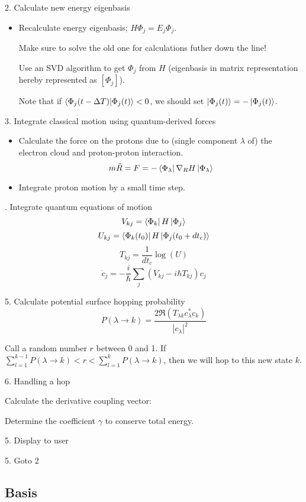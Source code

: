 \documentclass[12pt]{article}
\newcommand{\eigbasis}[0]{[\Phi_j]}
\begin{document}
2. Calculate new energy eigenbasis
\begin{itemize}
    \item Recalculate energy eigenbasis; $H\Phi_j = E_j\Phi_j$.

        Make sure to solve the old one for calculations futher down the line!

        Use an SVD algorithm to get $\Phi_j$ from $H$ (eigenbasis in matrix representation hereby represented as $\eigbasis$).

        Note that if $\bra{\Phi_j(t - \Delta T)}\ket{\Phi_j(t)} < 0$, we should set $\ket{\Phi_j(t)} = -\ket{\Phi_j(t)}$.
\end{itemize}

3. Integrate classical motion using quantum-derived forces
\begin{itemize}
    \item Calculate the force on the protons due to (single component $\lambda$ of) the electron cloud and proton-proton interaction.
        \[ m\ddot{R} = F = -\bra{\Phi_\lambda}\nabla_R H\ket{\Phi_\lambda} \]

    \item Integrate proton motion by a small time step.
\end{itemize}

. Integrate quantum equations of motion
\[ V_{kj} = \bra{\Phi_k}H\ket{\Phi_j} \]
\[ U_{kj} = \bra{\Phi_k(t_0)}H\ket{\Phi_j(t_0 + dt_c)} \]
\[ T_{kj} = \frac{1}{dt_c}\log(U) \]
\[ \dot{c}_j = -\frac{i}{\hbar} \sum_j (V_{kj} - i\hbar T_{kj})c_j \]

5. Calculate potential surface hopping probability
\[ P(\lambda\to k) = \frac{2\Re(T_{\lambda k} c_\lambda^* c_k)}{|c_\lambda|^2} \]

Call a random number $r$ between 0 and 1. If $\sum_{l=1}^{k-1} P(\lambda\to k) < r < \sum_{l=1}^k P(\lambda\to k)$, then we will hop to this new state $k$.  

6. Handling a hop

Calculate the derivative coupling vector:


Determine the coefficient $\gamma$ to conserve total energy.

5. Display to user

5. Goto 2

\subsection{Basis}
\end{document}
